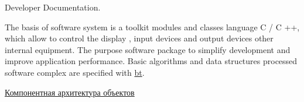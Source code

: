 Developer Documentation.

The basis of software system is a toolkit modules and classes language C / C ++, which allow to control the display , input devices and output devices other internal equipment. The purpose software package to simplify development and improve application performance. Basic algorithms and data structures processed software complex are specified with \hyperlink{namespacebt}{bt}.

\hyperlink{page1}{Компонентная архитектура объектов} 
